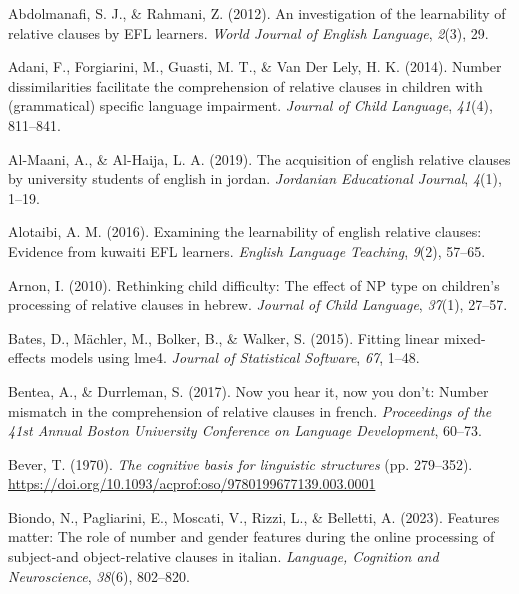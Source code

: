 \documentclass[
]{article}
\newlength{\cslhangindent}
\newenvironment{CSLReferences}[2] %
 {\begin{list}{}{%
  \setlength{\itemindent}{0pt}
  \setlength{\leftmargin}{0pt}
  \setlength{\parsep}{0pt}
  \ifodd #1
   \setlength{\leftmargin}{\cslhangindent}
   \setlength{\itemindent}{-1\cslhangindent}
  \fi
  \setlength{\itemsep}{#2\baselineskip}}}
 {\end{list}}
\begin{document}
\label{refs}
\begin{CSLReferences}{1}{0}
Abdolmanafi, S. J., \& Rahmani, Z. (2012). An investigation of the
learnability of relative clauses by EFL learners. \emph{World Journal of
English Language}, \emph{2}(3), 29.

Adani, F., Forgiarini, M., Guasti, M. T., \& Van Der Lely, H. K. (2014).
Number dissimilarities facilitate the comprehension of relative clauses
in children with (grammatical) specific language impairment.
\emph{Journal of Child Language}, \emph{41}(4), 811--841.

Al-Maani, A., \& Al-Haija, L. A. (2019). The acquisition of english
relative clauses by university students of english in jordan.
\emph{Jordanian Educational Journal}, \emph{4}(1), 1--19.

Alotaibi, A. M. (2016). Examining the learnability of english relative
clauses: Evidence from kuwaiti EFL learners. \emph{English Language
Teaching}, \emph{9}(2), 57--65.

Arnon, I. (2010). Rethinking child difficulty: The effect of NP type on
children's processing of relative clauses in hebrew. \emph{Journal of
Child Language}, \emph{37}(1), 27--57.

Bates, D., Mächler, M., Bolker, B., \& Walker, S. (2015). Fitting linear
mixed-effects models using lme4. \emph{Journal of Statistical Software},
\emph{67}, 1--48.

Bentea, A., \& Durrleman, S. (2017). Now you hear it, now you don't:
Number mismatch in the comprehension of relative clauses in french.
\emph{Proceedings of the 41st Annual Boston University Conference on
Language Development}, 60--73.

Bever, T. (1970). \emph{The cognitive basis for linguistic structures}
(pp. 279--352).
\url{https://doi.org/10.1093/acprof:oso/9780199677139.003.0001}

Biondo, N., Pagliarini, E., Moscati, V., Rizzi, L., \& Belletti, A.
(2023). Features matter: The role of number and gender features during
the online processing of subject-and object-relative clauses in italian.
\emph{Language, Cognition and Neuroscience}, \emph{38}(6), 802--820.


\end{CSLReferences}
\end{document}
